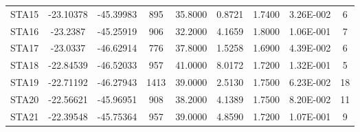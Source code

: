 \begin{table}[!Ht]
\begin{tabular}{| c | c | c | c | c | c | c | c | c |}
STA15 & -23.10378 & -45.39983 & 895 & 35.8000 & 0.8721 & 1.7400 & 3.26E-002 & 6\\
STA16 & -23.2387 & -45.25919 & 906 & 32.2000 & 4.1659 & 1.8000 & 1.06E-001 & 7\\
STA17 & -23.0337 & -46.62914 & 776 & 37.8000 & 1.5258 & 1.6900 & 4.39E-002 & 6\\
STA18 & -22.84539 & -46.52033 & 957 & 41.0000 & 8.0172 & 1.7200 & 1.32E-001 & 5\\
STA19 & -22.71192 & -46.27943 & 1413 & 39.0000 & 2.5130 & 1.7500 & 6.23E-002 & 18\\
STA20 & -22.56621 & -45.96951 & 908 & 38.2000 & 4.1389 & 1.7500 & 8.20E-002 & 11\\
STA21 & -22.39548 & -45.75364 & 957 & 39.0000 & 4.8590 & 1.7200 & 1.07E-001 & 9\\
\hline
\end{tabular}
\label{tabelaMoho}
\end{table}
